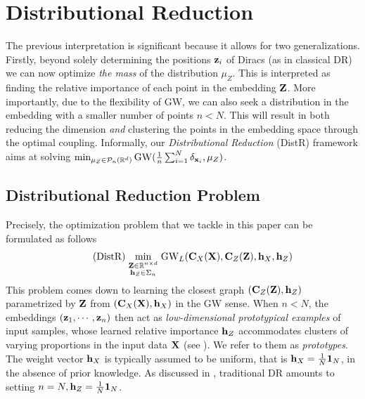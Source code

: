 

\section{Distributional Reduction}\label{sec:DDR}


The previous interpretation is significant because it allows for two generalizations. Firstly, beyond solely determining the positions ${\mathbf{z}}_i$ of Diracs (as in classical DR) we can now optimize \emph{the mass} of the distribution $\mu_Z$. This is interpreted as finding the relative importance of each point in the embedding ${\mathbf{Z}}$. More importantly, due to the flexibility of GW, we can also seek a distribution in the embedding with a smaller number of points $n < N$. This will result in both reducing the dimension \emph{and} clustering the points in the embedding space through the optimal coupling. Informally, our \emph{Distributional Reduction} (DistR) framework aims at solving $\min_{\mu_Z \in {\mathcal{P}}_n(\mathbb{R}^d)} \operatorname{GW}(\frac{1}{n} \sum_{i=1}^{N} \delta_{{\mathbf{x}}_i}, \mu_Z)$.


\subsection{Distributional Reduction Problem}\label{sec:DDR_ob}

Precisely, the optimization problem that we tackle in this paper can be formulated as follows
\begin{align}\tag{DistR}\label{eq:Dist-DR}
	\min_{\begin{smallmatrix} {\mathbf{Z}} \in \mathbb{R}^{n \times d} \\ {\mathbf{h}}_Z \in \Sigma_n \end{smallmatrix}} \operatorname{GW}_L ({\mathbf{C}}_{X}({\mathbf{X}}), {\mathbf{C}}_{Z}({\mathbf{Z}}), {\mathbf{h}}_X, {\mathbf{h}}_Z)
\end{align}
This problem comes down to learning the closest graph $({\mathbf{C}}_Z({\mathbf{Z}}), {\mathbf{h}}_Z)$ parametrized by ${\mathbf{Z}}$ from $({\mathbf{C}}_X({\mathbf{X}}), {\mathbf{h}}_X)$ in the GW sense. When $n < N$, the embeddings $({\mathbf{z}}_1, \cdots, {\mathbf{z}}_n)$ then act as \emph{low-dimensional prototypical examples} of input samples, whose learned relative importance ${\mathbf{h}}_Z$ accommodates clusters of varying proportions in the input data ${\mathbf{X}}$ (see ). We refer to them as \emph{prototypes}. The weight vector ${\mathbf{h}}_X$ is typically assumed to be uniform, that is ${\mathbf{h}}_X=\frac{1}{N} \bm{1}_N$, in the absence of prior knowledge. As discussed in , traditional DR amounts to setting $n = N, {\mathbf{h}}_Z = \frac{1}{N} \bm{1}_N$.

